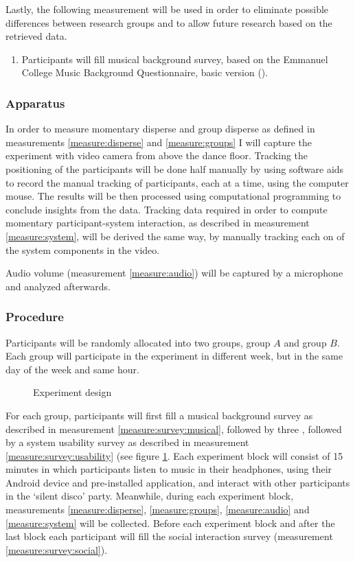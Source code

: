 Lastly, the following measurement will be used in order to eliminate possible differences between research groups and to allow future research based on the retrieved data.
\begin{enumerate}[resume]
	\item \label{measure:survey:musical} Participants will fill musical background survey, based on the Emmanuel College Music Background Questionnaire, basic version (\cite{web:zhao12}).
\end{enumerate}

\subsubsection{Apparatus}

In order to measure momentary disperse and group disperse as defined in measurements \ref{measure:disperse} and \ref{measure:groups} I will capture the experiment with video camera from above the dance floor.
Tracking the positioning of the participants will be done half manually by using software aids to record the manual tracking of participants, each at a time, using the computer mouse.
The results will be then processed using computational programming to conclude insights from the data.
Tracking data required in order to compute momentary participant-system interaction, as described in measurement \ref{measure:system}, will be derived the same way, by manually tracking each on of the system components in the video.

Audio volume (measurement \ref{measure:audio}) will be captured by a microphone and analyzed afterwards.

\subsubsection{Procedure}

Participants will be randomly allocated into two groups, group $A$ and group $B$\@.
Each group will participate in the experiment in different week, but in the same day of the week and same hour.

\begin{figure}[!hb]
	\centering
	\def\svgwidth{0.8\textwidth}
  	
	\caption{Experiment design}\label{fig:experiment}
\end{figure}

For each group, participants will first fill a musical background survey as described in measurement \ref{measure:survey:musical}, followed by three , followed by a system usability survey as described in measurement \ref{measure:survey:usability} (see figure \ref{fig:experiment}.
Each experiment block will consist of 15 minutes in which participants listen to music in their headphones, using their Android device and pre-installed application, and interact with other participants in the `silent disco' party.
Meanwhile, during each experiment block, measurements \ref{measure:disperse}, \ref{measure:groups}, \ref{measure:audio} and \ref{measure:system} will be collected.
Before each experiment block and after the last block each participant will fill the social interaction survey (measurement \ref{measure:survey:social}).

